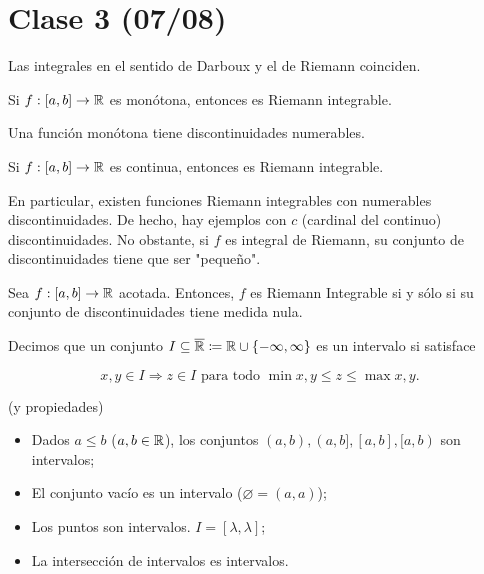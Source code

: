 
	\section{Clase 3 (07/08)}

	\begin{note}
		Las integrales en el sentido de Darboux y el de Riemann coinciden.
	\end{note}

	\begin{prop}
		Si $f:[a,b]\to\mathbb{R}$ es monótona, entonces es Riemann integrable.
	\end{prop}

	\begin{remark}
		Una función monótona tiene discontinuidades numerables.
	\end{remark}

	\begin{prop}
		Si $f:[a,b]\to\mathbb{R}$ es continua, entonces es Riemann integrable.
	\end{prop}

	En particular, existen funciones Riemann integrables con numerables discontinuidades. De hecho, hay ejemplos con $c$ (cardinal del continuo) discontinuidades. No obstante, si $f$ es integral de Riemann, su conjunto de discontinuidades tiene que ser "pequeño".

	\begin{theorem}
		Sea $f:[a,b]\to\mathbb{R}$ acotada. Entonces, $f$ es Riemann Integrable si y sólo si su conjunto de discontinuidades tiene medida nula.
	\end{theorem}

	\begin{definition}[intervalo]
		Decimos que un conjunto $I\subseteq\overline{\mathbb{R}}\coloneq\mathbb{R}\cup \{-\infty,\infty\}$ es un intervalo si satisface

		\[
		x,y\in I \Rightarrow z\in I \text{ para todo } \min x,y\leq z\leq\max x,y.
		\]
	\end{definition}

	\begin{eg}
		(y propiedades)
		\begin{itemize}
			\item Dados $a\leq b$ ($a,b\in\mathbb{R}$), los conjuntos $(a,b),(a,b],[a,b],[a,b)$ son intervalos;

			\item El conjunto vacío es un intervalo ($\varnothing = (a,a)$);

			\item Los puntos son intervalos. $I = [\lambda,\lambda]$;

			\item La intersección de intervalos es intervalos.
		\end{itemize}
	\end{eg}

